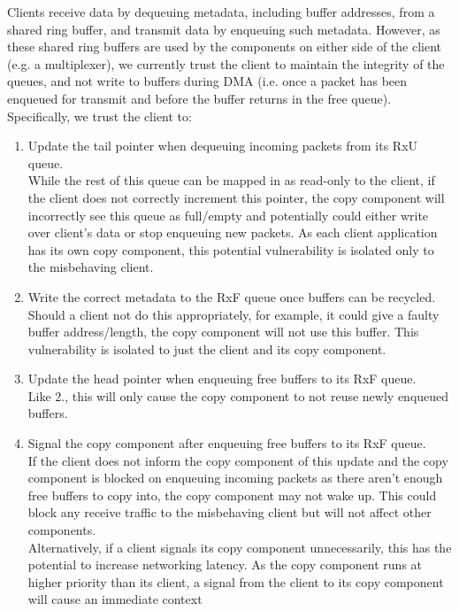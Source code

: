 Clients receive data by dequeuing metadata, including buffer addresses, from a shared ring buffer, and transmit data by enqueuing such metadata. 
However, as these shared ring buffers are used by the components on either side of the client (e.g. a multiplexer), we currently 
trust the client to maintain the integrity of the queues, and not write to buffers during DMA (i.e. once a packet has been enqueued
for transmit and before the buffer returns in the free queue). Specifically, we trust the client to:
\begin{enumerate}
    \item Update the tail pointer when dequeuing incoming packets from its RxU queue.\\
    While the rest of this queue can be mapped in as read-only to the client, if the client does not correctly increment this pointer,
    the copy component will incorrectly see this queue as full/empty and potentially could either write over client's data or stop
    enqueuing new packets. As each client application has its own copy component, this potential vulnerability is isolated only to
    the misbehaving client.
    \item Write the correct metadata to the RxF queue once buffers can be recycled.\\ 
    Should a client not do this appropriately, for example, it could give a faulty buffer address/length, the copy component will not 
    use this buffer. This vulnerability is isolated to just the client and its copy component.
    \item Update the head pointer when enqueuing free buffers to its RxF queue.\\
    Like 2., this will only cause the copy component to not reuse newly enqueued buffers.
    \item Signal the copy component after enqueuing free buffers to its RxF queue.\\
    If the client does not inform the copy component of this update and the copy component is blocked on enqueuing incoming packets as there
    aren't enough free buffers to copy into, the copy component may not wake up. This could block any receive traffic to the misbehaving client
    but will not affect other components.\\
    Alternatively, if a client signals its copy component unnecessarily, this has the potential to increase networking latency. 
    As the copy component runs at higher priority than its client, a signal from the client to its copy component will cause an immediate context

\end{enumerate}
